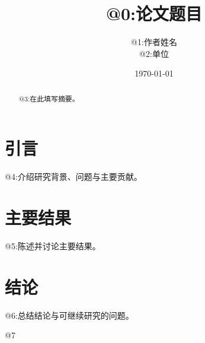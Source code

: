 \documentclass[UTF8,11pt,reqno]{ctexart}
\title{@{0:论文题目}}
\author{@{1:作者姓名}\\
  \small @{2:单位}}
\date{\today}
\numberwithin{equation}{section}
\theoremstyle{plain}
\theoremstyle{definition}
\theoremstyle{remark}
\begin{document}
\maketitle

\begin{abstract}
@{3:在此填写摘要。}
\end{abstract}

\section{引言}

@{4:介绍研究背景、问题与主要贡献。}

\section{主要结果}

@{5:陈述并讨论主要结果。}

\section{结论}

@{6:总结结论与可继续研究的问题。}




@7
\end{document}
